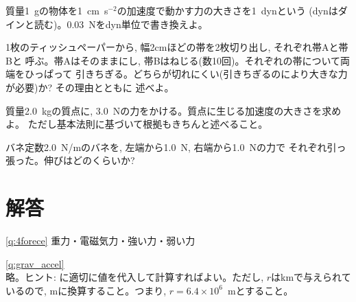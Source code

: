 \begin{exq} 質量1~gの物体を1~cm~s$^{-2}$の加速度で動かす力の大きさを1~dynという
(dynはダインと読む)。0.03~Nをdyn単位で書き換えよ。\end{exq}

\begin{exq} 1枚のティッシュペーパーから, 幅2cmほどの帯を2枚切り出し, それぞれ帯Aと帯Bと
呼ぶ。帯Aはそのままにし, 帯Bはねじる(数10回)。それぞれの帯について両端をひっぱって
引きちぎる。どちらが切れにくい(引きちぎるのにより大きな力が必要)か? その理由とともに
述べよ。\end{exq}

\begin{exq} 質量2.0~kgの質点に, 3.0~Nの力をかける。質点に生じる加速度の大きさを求めよ。
ただし基本法則に基づいて根拠もきちんと述べること。\end{exq}

\begin{exq} バネ定数2.0~N/mのバネを, 左端から1.0~N, 右端から1.0~Nの力で
それぞれ引っ張った。伸びはどのくらいか?\end{exq}





\section{解答}

\ref{q:4forece} 重力・電磁気力・強い力・弱い力
\mv

\ref{q:grav_accel}\\
略。ヒント: に適切に値を代入して計算すればよい。ただし, $r$はkmで与えられて
いるので, mに換算すること。つまり, $r=6.4\times10^6$~mとすること。
\vspace{0.2cm}


